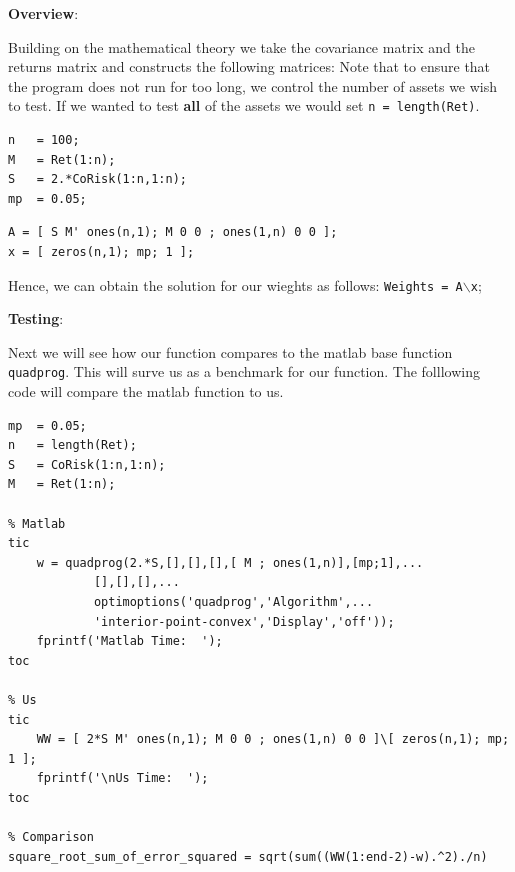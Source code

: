 \documentclass[12pt,titlepage,a4paper]{article}
\begin{document}
\begin{par}
\textbf{Overview}:
\end{par} \vspace{1em}
\begin{par}
Building on the mathematical theory we take the covariance matrix and the returns matrix and constructs the following matrices: Note that to ensure that the program does not run for too long, we control the number of assets we wish to test. If we wanted to test \textbf{all} of the assets we would set \texttt{n = length(Ret)}.
\end{par} \vspace{1em}
\begin{verbatim}n   = 100;
M   = Ret(1:n);
S   = 2.*CoRisk(1:n,1:n);
mp  = 0.05;\end{verbatim}
\begin{verbatim}A = [ S M' ones(n,1); M 0 0 ; ones(1,n) 0 0 ];
x = [ zeros(n,1); mp; 1 ];\end{verbatim}
\begin{par}
Hence, we can obtain the solution for our wieghts as follows: \texttt{Weights = A\ensuremath{\backslash}x};
\end{par} \vspace{1em}
\begin{par}
\textbf{Testing}:
\end{par} \vspace{1em}
\begin{par}
Next we will see how our function compares to the matlab base function \texttt{quadprog}. This will surve us as a benchmark for our function. The folllowing code will compare the matlab function to us.
\end{par} \vspace{1em}
\begin{verbatim}
mp  = 0.05;
n   = length(Ret);
S   = CoRisk(1:n,1:n);
M   = Ret(1:n);

% Matlab
tic
    w = quadprog(2.*S,[],[],[],[ M ; ones(1,n)],[mp;1],...
            [],[],[],...
            optimoptions('quadprog','Algorithm',...
            'interior-point-convex','Display','off'));
    fprintf('Matlab Time:  ');
toc

% Us
tic
    WW = [ 2*S M' ones(n,1); M 0 0 ; ones(1,n) 0 0 ]\[ zeros(n,1); mp; 1 ];
    fprintf('\nUs Time:  ');
toc

% Comparison
square_root_sum_of_error_squared = sqrt(sum((WW(1:end-2)-w).^2)./n)
\end{verbatim}
\end{document}
